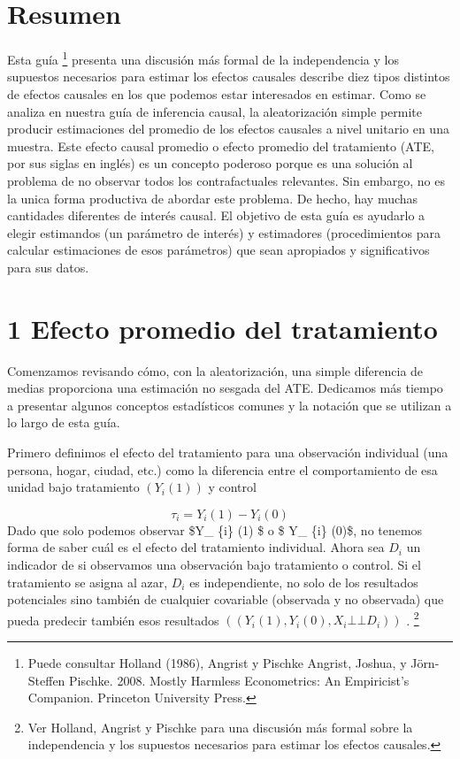 \documentclass[
]{article}
\author{}
\date{\vspace{-2.5em}}
\begin{document}
{
\setcounter{tocdepth}{2}
\tableofcontents
}
\hypertarget{resumen}{%
\section{Resumen}\label{resumen}}

Esta guía \footnote{Puede consultar Holland (1986), Angrist y Pischke
  Angrist, Joshua, y Jörn-Steffen Pischke. 2008. Mostly Harmless
  Econometrics: An Empiricist's Companion. Princeton University Press.}
presenta una discusión más formal de la independencia y los supuestos
necesarios para estimar los efectos causales describe diez tipos
distintos de efectos causales en los que podemos estar interesados en
estimar. Como se analiza en nuestra guía de inferencia causal, la
aleatorización simple permite producir estimaciones del promedio de los
efectos causales a nivel unitario en una muestra. Este efecto causal
promedio o efecto promedio del tratamiento (ATE, por sus siglas en
inglés) es un concepto poderoso porque es una solución al problema de no
observar todos los contrafactuales relevantes. Sin embargo, no es la
unica forma productiva de abordar este problema. De hecho, hay muchas
cantidades diferentes de interés causal. El objetivo de esta guía es
ayudarlo a elegir estimandos (un parámetro de interés) y estimadores
(procedimientos para calcular estimaciones de esos parámetros) que sean
apropiados y significativos para sus datos.

\hypertarget{efecto-promedio-del-tratamiento}{%
\section{1 Efecto promedio del
tratamiento}\label{efecto-promedio-del-tratamiento}}

Comenzamos revisando cómo, con la aleatorización, una simple diferencia
de medias proporciona una estimación no sesgada del ATE. Dedicamos más
tiempo a presentar algunos conceptos estadísticos comunes y la notación
que se utilizan a lo largo de esta guía.

Primero definimos el efecto del tratamiento para una observación
individual (una persona, hogar, ciudad, etc.) como la diferencia entre
el comportamiento de esa unidad bajo tratamiento \((Y_ {i} (1))\) y
control

\[τ_{i}=Y_{i}(1)−Y_{i}(0)\] Dado que solo podemos observar \$Y\_ \{i\}
(1) \$ o \$ Y\_ \{i\} (0)\$, no tenemos forma de saber cuál es el efecto
del tratamiento individual. Ahora sea \(D_{i}\) un indicador de si
observamos una observación bajo tratamiento o control. Si el tratamiento
se asigna al azar, \(D_ {i}\) es independiente, no solo de los
resultados potenciales sino también de cualquier covariable (observada y
no observada) que pueda predecir también esos resultados
\(((Y_ {i} (1), Y_ {i } (0),X_ {i} ⊥⊥D_ {i}))\) . \footnote{Ver Holland,
  Angrist y Pischke para una discusión más formal sobre la independencia
  y los supuestos necesarios para estimar los efectos causales.}
\end{document}
